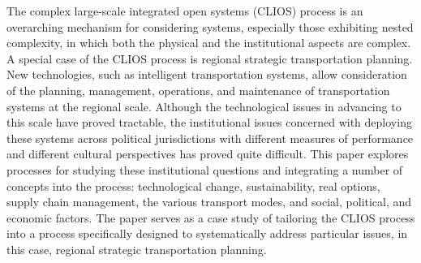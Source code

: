 The complex large-scale integrated open systems (CLIOS) process is an overarching mechanism for considering systems, especially those exhibiting nested complexity, in which both the physical and the institutional aspects are complex. A special case of the CLIOS process is regional strategic transportation planning. New technologies, such as intelligent transportation systems, allow consideration of the planning, management, operations, and maintenance of transportation systems at the regional scale. Although the technological issues in advancing to this scale have proved tractable, the institutional issues concerned with deploying these systems across political jurisdictions with different measures of performance and different cultural perspectives has proved quite difficult. This paper explores processes for studying these institutional questions and integrating a number of concepts into the process: technological change, sustainability, real options, supply chain management, the various transport modes, and social, political, and economic factors. The paper serves as a case study of tailoring the CLIOS process into a process specifically designed to systematically address particular issues, in this case, regional strategic transportation planning.
